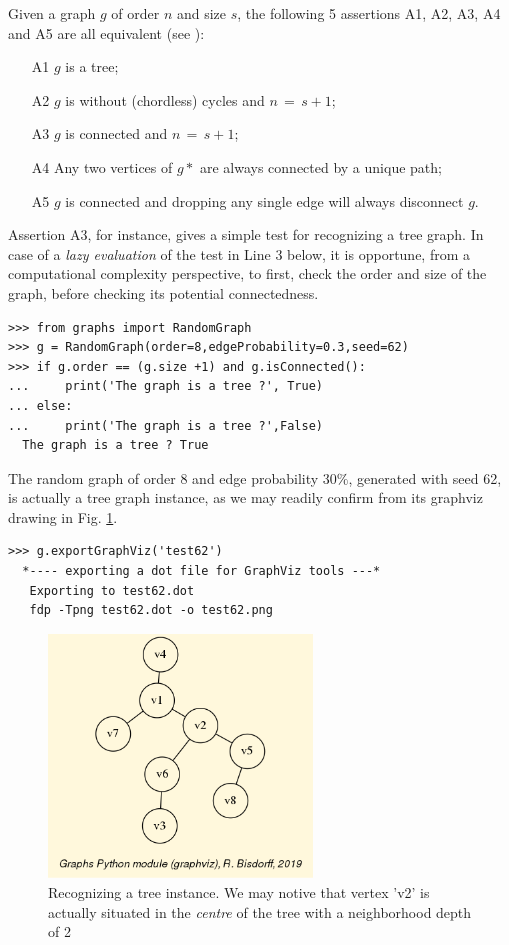 Given a graph $g$ of order $n$ and size $s$, the following 5 assertions A1, A2, A3, A4 and A5 are all equivalent (see \citep{BAR-1991}):
\begin{itemize}
\item [A1] $g$ is a tree;
\item [A2] $g$ is without (chordless) cycles and $n \,=\, s + 1$;
\item [A3] $g$ is connected and $n \,=\, s + 1$;
\item [A4] Any two vertices of $g*$ are always connected by a unique path;
\item [A5] $g$ is connected and dropping any single edge will always disconnect $g$.
\end{itemize}
Assertion A3, for instance, gives a simple test for recognizing a tree graph. In case of a \emph{lazy evaluation} of the test in Line 3 below, it is opportune, from a computational complexity perspective, to first, check the order and size of the graph, before checking its potential connectedness.
\begin{lstlisting}
>>> from graphs import RandomGraph
>>> g = RandomGraph(order=8,edgeProbability=0.3,seed=62)
>>> if g.order == (g.size +1) and g.isConnected():
...     print('The graph is a tree ?', True)
... else:
...     print('The graph is a tree ?',False)   
  The graph is a tree ? True
\end{lstlisting}
The random graph of order 8 and edge probability $30\%$, generated with seed 62, is actually a tree graph instance, as we may readily confirm from its graphviz drawing in Fig. \ref{fig:23.3}.
\begin{lstlisting}
>>> g.exportGraphViz('test62')
  *---- exporting a dot file for GraphViz tools ---*
   Exporting to test62.dot
   fdp -Tpng test62.dot -o test62.png
\end{lstlisting}
\begin{figure}[h]
\sidecaption
\includegraphics[width=7cm]{Figures/test62.png}
\caption{Recognizing a tree instance. We may notive that vertex 'v2' is actually situated in the \emph{centre} of the tree with a neighborhood depth of 2} 
\label{fig:23.3}       %
\end{figure}

